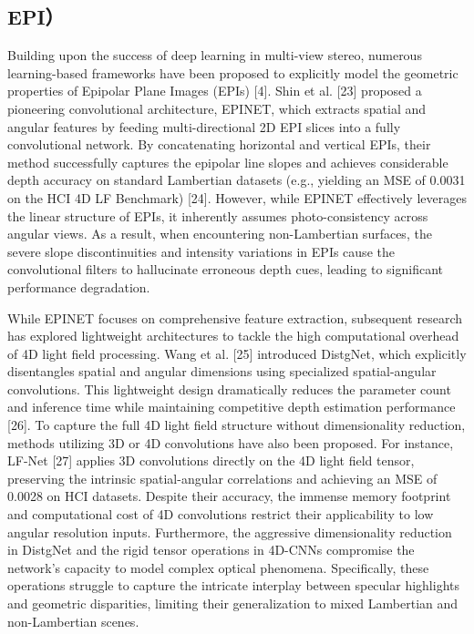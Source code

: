 \subsection{EPI）}

Building upon the success of deep learning in multi-view stereo, numerous learning-based frameworks have been proposed to explicitly model the geometric properties of Epipolar Plane Images (EPIs) [4]. Shin et al. [23] proposed a pioneering convolutional architecture, EPINET, which extracts spatial and angular features by feeding multi-directional 2D EPI slices into a fully convolutional network. By concatenating horizontal and vertical EPIs, their method successfully captures the epipolar line slopes and achieves considerable depth accuracy on standard Lambertian datasets (e.g., yielding an MSE of 0.0031 on the HCI 4D LF Benchmark) [24]. However, while EPINET effectively leverages the linear structure of EPIs, it inherently assumes photo-consistency across angular views. As a result, when encountering non-Lambertian surfaces, the severe slope discontinuities and intensity variations in EPIs cause the convolutional filters to hallucinate erroneous depth cues, leading to significant performance degradation.

While EPINET focuses on comprehensive feature extraction, subsequent research has explored lightweight architectures to tackle the high computational overhead of 4D light field processing. Wang et al. [25] introduced DistgNet, which explicitly disentangles spatial and angular dimensions using specialized spatial-angular convolutions. This lightweight design dramatically reduces the parameter count and inference time while maintaining competitive depth estimation performance [26]. To capture the full 4D light field structure without dimensionality reduction, methods utilizing 3D or 4D convolutions have also been proposed. For instance, LF-Net [27] applies 3D convolutions directly on the 4D light field tensor, preserving the intrinsic spatial-angular correlations and achieving an MSE of 0.0028 on HCI datasets. Despite their accuracy, the immense memory footprint and computational cost of 4D convolutions restrict their applicability to low angular resolution inputs. Furthermore, the aggressive dimensionality reduction in DistgNet and the rigid tensor operations in 4D-CNNs compromise the network's capacity to model complex optical phenomena. Specifically, these operations struggle to capture the intricate interplay between specular highlights and geometric disparities, limiting their generalization to mixed Lambertian and non-Lambertian scenes.


